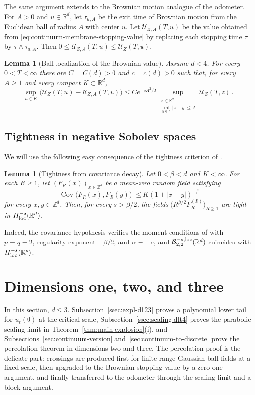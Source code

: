 \documentclass[11pt]{amsart}
\theoremstyle{plain}
\newtheorem{lemma}[theorem]{Lemma}
\theoremstyle{definition}
\newcommand{\Z}{\mathbb{Z}}
\newcommand{\R}{\mathbb{R}}
\DeclareMathOperator{\Cov}{Cov}
\begin{document}
	The same argument extends to the Brownian motion analogue of the odometer. For $A>0$ and
	$u\in\R^d$, let $\tau_{u,A}$ be the exit time of Brownian motion from the
	Euclidean ball of radius $A$ with center $u$. Let $\mathcal U_{Z,A}(T,u)$
	be the value obtained from \eqref{eq:continuum-membrane-stopping-value} by
	replacing each stopping time $\tau$ by $\tau\wedge\tau_{u,A}$. Then
	$0\leq\mathcal U_{Z,A}(T,u)\leq\mathcal U_Z(T,u)$.

	\begin{lemma}[Ball localization of the Brownian value]\label{lem:brownian-ball-localization}
	Assume $d<4$. For every $0<T<\infty$ there are $C=C(d)>0$ and $c=c(d)>0$
	such that, for every $A\geq1$ and every compact $K\subset\R^d$,
	\[
		\sup_{u\in K}
		\bigl(\mathcal U_Z(T,u)-\mathcal U_{Z,A}(T,u)\bigr)
		\leq
		Ce^{-cA^2/T}
		\sup_{\substack{z\in\R^d:\\ \inf_{y\in K}|z-y|\leq A}}
		\mathcal U_Z(T,z)\, .
	\]
	\end{lemma}

	\subsection{Tightness in negative Sobolev spaces}\label{ssec:sobolev-tightness}
	We will use the following easy consequence of the tightness
	criterion of \citet{FurlanMourrat}.

	\begin{lemma}[Tightness from covariance decay]\label{lem:sobolev-tightness}
		Let $0<\beta<d$ and $K<\infty$. For each $R\geq1$, let
		$(F_R(x))_{x\in\Z^d}$ be a mean-zero random field satisfying
		\[
			\bigl|\Cov\bigl(F_R(x),F_R(y)\bigr)\bigr|
			\leq K(1+|x-y|)^{-\beta}
		\]
		for every $x,y\in\Z^d$. Then, for every $s>\beta/2$, the fields
		$\bigl(R^{\beta/2}F_R^{(R)}\bigr)_{R\geq1}$ are tight in
		$H^{-s}_{\rm loc}(\R^d)$.
	\end{lemma}

	Indeed, the covariance hypothesis verifies the moment conditions of
	\citet[Theorem~2.30]{FurlanMourrat} with $p=q=2$, regularity exponent
	$-\beta/2$, and $\alpha=-s$, and
	$\mathcal B^{-s,{\rm loc}}_{2,2}(\R^d)$ coincides with
	$H^{-s}_{\rm loc}(\R^d)$.


	\section{Dimensions one, two, and three}\label{sec:dim123}

In this section, $d\leq3$. Subsection~\ref{ssec:expl-d123} proves a
polynomial lower tail for $u_t(0)$ at the critical scale,
Subsection~\ref{ssec:scaling-dlt4} proves the parabolic scaling limit in
Theorem~\ref{thm:main-explosion}(i), and
Subsections~\ref{sec:continuum-version} and~\ref{sec:continuum-to-discrete}
prove the percolation theorem in dimensions two and three. The percolation
proof is the delicate part: crossings are produced first for finite-range
Gaussian ball fields at a fixed scale, then upgraded to the Brownian stopping
value by a zero-one argument, and finally transferred to the odometer through
the scaling limit and a block argument.
\end{document}
